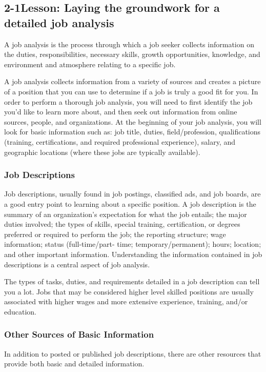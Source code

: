 \pagebreak \subsection*{2-1\quad Lesson: Laying the groundwork for a detailed job analysis}
A job analysis is the process through which a job seeker collects information on the duties, responsibilities, necessary skills, growth opportunities, knowledge, and environment and atmosphere relating to a specific job.

A job analysis collects information from a variety of sources and creates a picture of a position that you can use to determine if a job is truly a good fit for you. In order to perform a thorough job analysis, you will need to first identify the job you'd like to learn more about, and then seek out information from online sources, people, and organizations.
At the beginning of your job analysis, you will look for basic information such as: job title, duties, field/profession, qualifications (training, certifications, and required professional experience), salary, and geographic locations (where these jobs are typically available).
\subsubsection*{Job Descriptions}

Job descriptions, usually found in job postings, classified ads, and job boards, are a good entry point to learning about a specific position. A job description is the summary of an organization's expectation for what the job entails; the major duties involved; the types of skills, special training, certification, or degrees preferred or required to perform the job; the reporting structure; wage information; status (full-time/part- time; temporary/permanent); hours; location; and other important information. Understanding the information contained in job descriptions is a central aspect of job analysis.

The types of tasks, duties, and requirements detailed in a job description can tell you a lot. Jobs that may be considered higher level skilled positions are usually associated with higher wages and more extensive experience, training, and/or education.
\subsubsection*{Other Sources of Basic Information}
In addition to posted or published job descriptions, there are other resources that provide both basic and detailed information.
